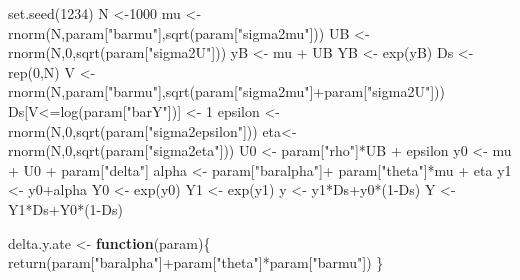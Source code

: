 \documentclass[
]{book}
\newenvironment{Shaded}{\begin{snugshade}}{\end{snugshade}}
\newcommand{\ControlFlowTok}[1]{\textcolor[rgb]{0.13,0.29,0.53}{\textbf{#1}}}
\newcommand{\DecValTok}[1]{\textcolor[rgb]{0.00,0.00,0.81}{#1}}
\newcommand{\FunctionTok}[1]{\textcolor[rgb]{0.00,0.00,0.00}{#1}}
\newcommand{\NormalTok}[1]{#1}
\newcommand{\OtherTok}[1]{\textcolor[rgb]{0.56,0.35,0.01}{#1}}
\newcommand{\SpecialCharTok}[1]{\textcolor[rgb]{0.00,0.00,0.00}{#1}}
\newcommand{\StringTok}[1]{\textcolor[rgb]{0.31,0.60,0.02}{#1}}
\theoremstyle{definition}
\theoremstyle{definition}
\theoremstyle{definition}
\theoremstyle{definition}
\theoremstyle{remark}
\begin{document}
\begin{Shaded}
\begin{Highlighting}[]
\FunctionTok{set.seed}\NormalTok{(}\DecValTok{1234}\NormalTok{)}
\NormalTok{N }\OtherTok{\textless{}{-}}\DecValTok{1000}
\NormalTok{mu }\OtherTok{\textless{}{-}} \FunctionTok{rnorm}\NormalTok{(N,param[}\StringTok{"barmu"}\NormalTok{],}\FunctionTok{sqrt}\NormalTok{(param[}\StringTok{"sigma2mu"}\NormalTok{]))}
\NormalTok{UB }\OtherTok{\textless{}{-}} \FunctionTok{rnorm}\NormalTok{(N,}\DecValTok{0}\NormalTok{,}\FunctionTok{sqrt}\NormalTok{(param[}\StringTok{"sigma2U"}\NormalTok{]))}
\NormalTok{yB }\OtherTok{\textless{}{-}}\NormalTok{ mu }\SpecialCharTok{+}\NormalTok{ UB }
\NormalTok{YB }\OtherTok{\textless{}{-}} \FunctionTok{exp}\NormalTok{(yB)}
\NormalTok{Ds }\OtherTok{\textless{}{-}} \FunctionTok{rep}\NormalTok{(}\DecValTok{0}\NormalTok{,N)}
\NormalTok{V }\OtherTok{\textless{}{-}} \FunctionTok{rnorm}\NormalTok{(N,param[}\StringTok{"barmu"}\NormalTok{],}\FunctionTok{sqrt}\NormalTok{(param[}\StringTok{"sigma2mu"}\NormalTok{]}\SpecialCharTok{+}\NormalTok{param[}\StringTok{"sigma2U"}\NormalTok{]))}
\NormalTok{Ds[V}\SpecialCharTok{\textless{}=}\FunctionTok{log}\NormalTok{(param[}\StringTok{"barY"}\NormalTok{])] }\OtherTok{\textless{}{-}} \DecValTok{1} 
\NormalTok{epsilon }\OtherTok{\textless{}{-}} \FunctionTok{rnorm}\NormalTok{(N,}\DecValTok{0}\NormalTok{,}\FunctionTok{sqrt}\NormalTok{(param[}\StringTok{"sigma2epsilon"}\NormalTok{]))}
\NormalTok{eta}\OtherTok{\textless{}{-}} \FunctionTok{rnorm}\NormalTok{(N,}\DecValTok{0}\NormalTok{,}\FunctionTok{sqrt}\NormalTok{(param[}\StringTok{"sigma2eta"}\NormalTok{]))}
\NormalTok{U0 }\OtherTok{\textless{}{-}}\NormalTok{ param[}\StringTok{"rho"}\NormalTok{]}\SpecialCharTok{*}\NormalTok{UB }\SpecialCharTok{+}\NormalTok{ epsilon}
\NormalTok{y0 }\OtherTok{\textless{}{-}}\NormalTok{ mu }\SpecialCharTok{+}\NormalTok{  U0 }\SpecialCharTok{+}\NormalTok{ param[}\StringTok{"delta"}\NormalTok{]}
\NormalTok{alpha }\OtherTok{\textless{}{-}}\NormalTok{ param[}\StringTok{"baralpha"}\NormalTok{]}\SpecialCharTok{+}\NormalTok{  param[}\StringTok{"theta"}\NormalTok{]}\SpecialCharTok{*}\NormalTok{mu }\SpecialCharTok{+}\NormalTok{ eta}
\NormalTok{y1 }\OtherTok{\textless{}{-}}\NormalTok{ y0}\SpecialCharTok{+}\NormalTok{alpha}
\NormalTok{Y0 }\OtherTok{\textless{}{-}} \FunctionTok{exp}\NormalTok{(y0)}
\NormalTok{Y1 }\OtherTok{\textless{}{-}} \FunctionTok{exp}\NormalTok{(y1)}
\NormalTok{y }\OtherTok{\textless{}{-}}\NormalTok{ y1}\SpecialCharTok{*}\NormalTok{Ds}\SpecialCharTok{+}\NormalTok{y0}\SpecialCharTok{*}\NormalTok{(}\DecValTok{1}\SpecialCharTok{{-}}\NormalTok{Ds)}
\NormalTok{Y }\OtherTok{\textless{}{-}}\NormalTok{ Y1}\SpecialCharTok{*}\NormalTok{Ds}\SpecialCharTok{+}\NormalTok{Y0}\SpecialCharTok{*}\NormalTok{(}\DecValTok{1}\SpecialCharTok{{-}}\NormalTok{Ds)}

\NormalTok{delta.y.ate }\OtherTok{\textless{}{-}} \ControlFlowTok{function}\NormalTok{(param)\{}
  \FunctionTok{return}\NormalTok{(param[}\StringTok{"baralpha"}\NormalTok{]}\SpecialCharTok{+}\NormalTok{param[}\StringTok{"theta"}\NormalTok{]}\SpecialCharTok{*}\NormalTok{param[}\StringTok{"barmu"}\NormalTok{])}
\NormalTok{\}}
\end{Highlighting}
\end{Shaded}
\end{document}
